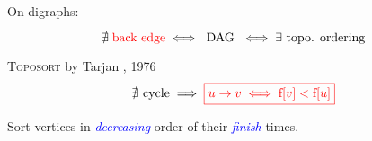 
\begin{frame}{}
  \centerline{\large On digraphs:}
  \[
    \nexists\; \text{\textcolor{red}{back edge}} \iff \text{ DAG } \iff \exists \text{ topo. ordering}
  \]

  \pause
  \begin{block}{\textsc{Toposort} by Tarjan , 1976}
    \vspace{0.30cm}
    \[
      \nexists \text{ cycle} \implies \textcolor{red}{\boxed{u \to v \iff \text{f}[v] < \text{f}[u]}}
    \]

    \pause
    \vspace{0.50cm}
    \centerline{Sort vertices in \textcolor{blue}{\emph{decreasing}} order of their \textcolor{blue}{\emph{finish}} times.}
  \end{block}
\end{frame}

% 
% 
% 
